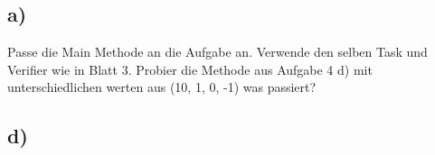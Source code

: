 \subsection*{a)}
	Passe die Main Methode an die Aufgabe an. Verwende den selben Task und Verifier wie in Blatt 3.
	Probier die Methode aus Aufgabe 4 d) mit unterschiedlichen werten aus (10, 1, 0, -1) was passiert?
\subsection*{d)}